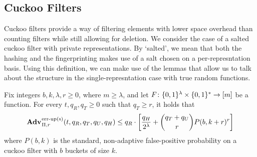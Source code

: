 \subsection{Cuckoo Filters}

Cuckoo filters provide a way of filtering elements with lower space overhead than counting filters while still allowing for deletion. We consider the case of a salted cuckoo filter with private representations. By `salted', we mean that both the hashing and the fingerprinting makes use of a salt chosen on a per-represntation basis. Using this definition, we can make use of the lemmas that allow us to talk about the structure in the single-represntation case with true random functions.

\begin{theorem}\label{thm:cuckoo-salt-bound}
Fix integers $b, k, \lambda, r\geq 0$, where $m \geq \lambda$, and let $F \colon \{0,1\}^\lambda \times \{0,1\}^* \to [m]$ be a function.
  For every $t, q_R, q_T \geq 0$ such that $q_T \geq r$, it holds that
  $$\Adv{\erreps}_{\struct,r}(t, q_R, q_T, q_U, q_H) \leq q_R \cdot
     \left[
      \frac{q_H}{2^\lambda} +
      {\dbinom{q_T+q_U}{r}} P(b,k+r)^r
    \right]$$
where $P(b,k)$ is the standard, non-adaptive false-positive probability on a cuckoo filter with $b$ buckets of size $k$.
\end{theorem}

